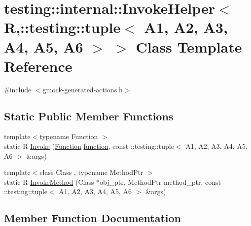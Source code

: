 \hypertarget{classtesting_1_1internal_1_1_invoke_helper_3_01_r_00_1_1testing_1_1tuple_3_01_a1_00_01_a2_00_01_6f3c1b6c3435aa3488b058deeeb8a74f}{}\section{testing\+:\+:internal\+:\+:Invoke\+Helper$<$ R,\+:\+:testing\+:\+:tuple$<$ A1, A2, A3, A4, A5, A6 $>$ $>$ Class Template Reference}
\label{classtesting_1_1internal_1_1_invoke_helper_3_01_r_00_1_1testing_1_1tuple_3_01_a1_00_01_a2_00_01_6f3c1b6c3435aa3488b058deeeb8a74f}


{\ttfamily \#include $<$gmock-\/generated-\/actions.\+h$>$}

\subsection*{Static Public Member Functions}
\begin{DoxyCompactItemize}
\item 
{\footnotesize template$<$typename Function $>$ }\\static R \hyperlink{classtesting_1_1internal_1_1_invoke_helper_3_01_r_00_1_1testing_1_1tuple_3_01_a1_00_01_a2_00_01_6f3c1b6c3435aa3488b058deeeb8a74f_a8025603713729f09a113092f4f2bd0db}{Invoke} (\hyperlink{structtesting_1_1internal_1_1_function}{Function} \hyperlink{_07copy_08_2_undistort_image_8m_aa0b19300b507d475ab9f1525750bc11f}{function}, const \+::testing\+::tuple$<$ A1, A2, A3, A4, A5, A6 $>$ \&args)
\item 
{\footnotesize template$<$class Class , typename Method\+Ptr $>$ }\\static R \hyperlink{classtesting_1_1internal_1_1_invoke_helper_3_01_r_00_1_1testing_1_1tuple_3_01_a1_00_01_a2_00_01_6f3c1b6c3435aa3488b058deeeb8a74f_a2adfff699bce3603b915b339e8e5e993}{Invoke\+Method} (Class $\ast$obj\+\_\+ptr, Method\+Ptr method\+\_\+ptr, const \+::testing\+::tuple$<$ A1, A2, A3, A4, A5, A6 $>$ \&args)
\end{DoxyCompactItemize}


\subsection{Member Function Documentation}
